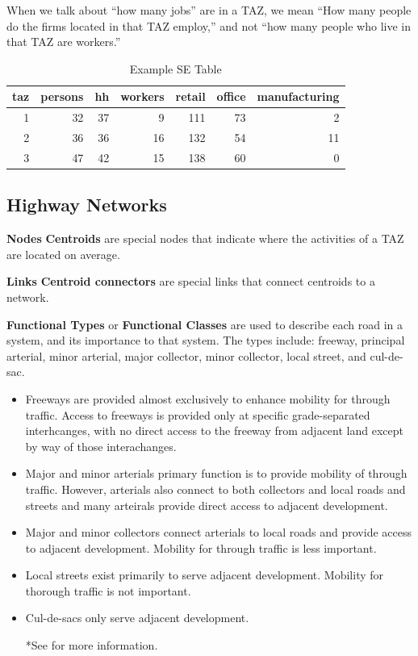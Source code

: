 \documentclass[
]{book}
\begin{document}
When we talk about ``how many jobs'' are in a TAZ, we mean ``How many people do
the firms located in that TAZ employ,'' and not ``how many people who live
in that TAZ are workers.''

\begin{table}

\caption{\label{tab:setable}Example SE Table}
\centering
\begin{tabular}[t]{r|r|r|r|r|r|r}
\hline
taz & persons & hh & workers & retail & office & manufacturing\\
\hline
1 & 32 & 37 & 9 & 111 & 73 & 2\\
\hline
2 & 36 & 36 & 16 & 132 & 54 & 11\\
\hline
3 & 47 & 42 & 15 & 138 & 60 & 0\\
\hline
\end{tabular}
\end{table}

\hypertarget{highway-networks}{%
\subsection{Highway Networks}\label{highway-networks}}

\textbf{Nodes} \textbf{Centroids} are special nodes that indicate where the activities
of a TAZ are located on average.

\textbf{Links} \textbf{Centroid connectors} are special links that connect centroids to a network.

\textbf{Functional Types} or \textbf{Functional Classes} are used to describe each road in
a system, and its importance to that system. The types include: freeway,
principal arterial, minor arterial, major collector, minor collector, local
street, and cul-de-sac.

\begin{itemize}
\item
  Freeways are provided almost exclusively to enhance mobility for through traffic.
  Access to freeways is provided only at specific grade-separated interhcanges,
  with no direct access to the freeway from adjacent land except by way of those
  interachanges.
\item
  Major and minor arterials primary function is to provide mobility of through
  traffic. However, arterials also connect to both collectors and local roads and
  streets and many arteirals provide direct access to adjacent development.
\item
  Major and minor collectors connect arterials to local roads and provide access
  to adjacent development. Mobility for through traffic is less important.
\item
  Local streets exist primarily to serve adjacent development. Mobility for
  thorough traffic is not important.
\item
  Cul-de-sacs only serve adjacent development.

  *See \citeyearpar{2018aashto} for more information.
\end{itemize}
\end{document}
